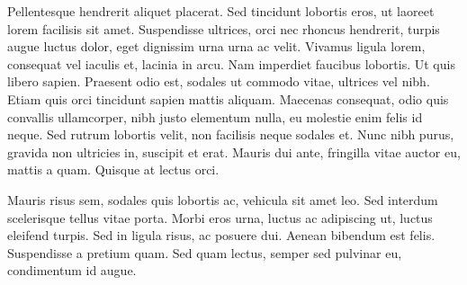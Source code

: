 Pellentesque hendrerit aliquet placerat. Sed tincidunt lobortis eros, ut laoreet lorem facilisis sit amet. Suspendisse ultrices, orci nec rhoncus hendrerit, turpis augue luctus dolor, eget dignissim urna urna ac velit. Vivamus ligula lorem, consequat vel iaculis et, lacinia in arcu. Nam imperdiet faucibus lobortis. Ut quis libero sapien. Praesent odio est, sodales ut commodo vitae, ultrices vel nibh. Etiam quis orci tincidunt sapien mattis aliquam. Maecenas consequat, odio quis convallis ullamcorper, nibh justo elementum nulla, eu molestie enim felis id neque. Sed rutrum lobortis velit, non facilisis neque sodales et. Nunc nibh purus, gravida non ultricies in, suscipit et erat. Mauris dui ante, fringilla vitae auctor eu, mattis a quam. Quisque at lectus orci.

Mauris risus sem, sodales quis lobortis ac, vehicula sit amet leo. Sed interdum scelerisque tellus vitae porta. Morbi eros urna, luctus ac adipiscing ut, luctus eleifend turpis. Sed in ligula risus, ac posuere dui. Aenean bibendum est felis. Suspendisse a pretium quam. Sed quam lectus, semper sed pulvinar eu, condimentum id augue.~\cite{Doe:2009}


